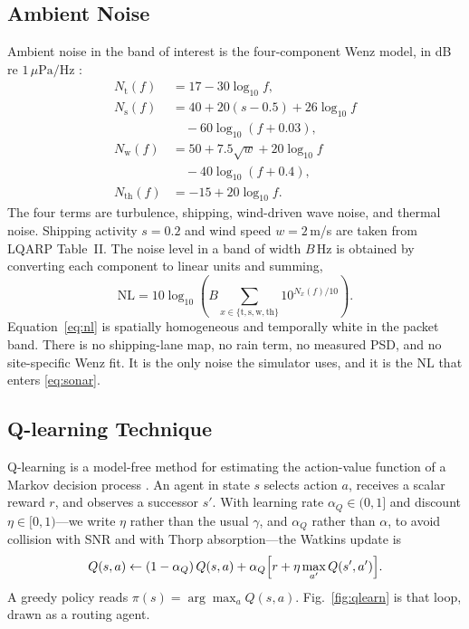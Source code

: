 \documentclass[journal]{IEEEtran}
\begin{document}
\subsection{Ambient Noise}
\label{sec:noise}

Ambient noise in the band of interest is the four-component Wenz
model, in dB re $1\,\mu\mathrm{Pa}/\mathrm{Hz}$
\cite{wenz1962noise,stojanovic2009channels,liu2026lqarp}:
\begin{subequations}
\label{eq:wenz}
\begin{align}
N_{\mathrm{t}}(f)&=17-30\log_{10}f,\\
N_{\mathrm{s}}(f)&=40+20(s-0.5)+26\log_{10}f \nonumber\\
&\quad-60\log_{10}(f+0.03),\\
N_{\mathrm{w}}(f)&=50+7.5\sqrt{w}+20\log_{10}f \nonumber\\
&\quad-40\log_{10}(f+0.4),\\
N_{\mathrm{th}}(f)&=-15+20\log_{10}f.
\end{align}
\end{subequations}
The four terms are turbulence, shipping, wind-driven wave noise, and
thermal noise.
Shipping activity $s=0.2$ and wind speed $w=2$\,m/s are taken from
LQARP Table~II.
The noise level in a band of width $B$\,Hz is obtained by converting
each component to linear units and summing,
\begin{equation}
\mathrm{NL}=10\log_{10}\!\left(B\sum_{x\in\{\mathrm{t,s,w,th}\}}10^{N_x(f)/10}\right).
\label{eq:nl}
\end{equation}
Equation~\eqref{eq:nl} is spatially homogeneous and temporally
white in the packet band.
There is no shipping-lane map, no rain term, no measured PSD, and
no site-specific Wenz fit.
It is the only noise the simulator uses, and it is the $\mathrm{NL}$
that enters \eqref{eq:sonar}.

\subsection{Q-learning Technique}
\label{sec:qlearn}

Q-learning is a model-free method for estimating the action-value
function of a Markov decision process
\cite{watkins1992qlearning,sutton2018rl}.
An agent in state $s$ selects action $a$, receives a scalar reward
$r$, and observes a successor $s'$.
With learning rate $\alpha_Q\in(0,1]$ and discount
$\eta\in[0,1)$---we write $\eta$ rather than the usual $\gamma$, and
$\alpha_Q$ rather than $\alpha$, to avoid collision with SNR and with
Thorp absorption---the Watkins update is
\begin{equation}
Q(s,a)\leftarrow
(1-\alpha_Q)\,Q(s,a)
+\alpha_Q\Bigl[r+\eta\max_{a'}Q(s',a')\Bigr].
\label{eq:qupdate}
\end{equation}
A greedy policy reads
$\pi(s)=\arg\max_{a}Q(s,a)$.
Fig.~\ref{fig:qlearn} is that loop, drawn as a routing agent.
\end{document}
